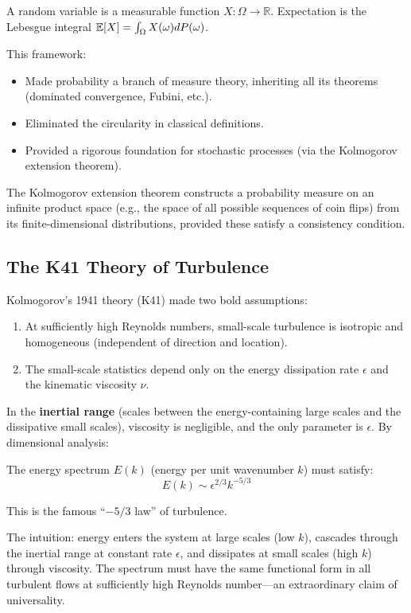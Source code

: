 A random variable is a measurable function $X: \Omega \to \mathbb{R}$. Expectation is the Lebesgue integral $\operatorname{\mathbb{E}}[X] = \int_\Omega X(\omega) dP(\omega)$.

This framework:
\begin{itemize}
    \item Made probability a branch of measure theory, inheriting all its theorems (dominated convergence, Fubini, etc.).
    \item Eliminated the circularity in classical definitions.
    \item Provided a rigorous foundation for stochastic processes (via the Kolmogorov extension theorem).
\end{itemize}

The Kolmogorov extension theorem constructs a probability measure on an infinite product space (e.g., the space of all possible sequences of coin flips) from its finite-dimensional distributions, provided these satisfy a consistency condition.

\subsection{The K41 Theory of Turbulence}

Kolmogorov's 1941 theory (K41) made two bold assumptions:
\begin{enumerate}
    \item At sufficiently high Reynolds numbers, small-scale turbulence is isotropic and homogeneous (independent of direction and location).
    \item The small-scale statistics depend only on the energy dissipation rate $\epsilon$ and the kinematic viscosity $\nu$.
\end{enumerate}

In the \textbf{inertial range} (scales between the energy-containing large scales and the dissipative small scales), viscosity is negligible, and the only parameter is $\epsilon$. By dimensional analysis:

The energy spectrum $E(k)$ (energy per unit wavenumber $k$) must satisfy:
\[
E(k) \sim \epsilon^{2/3} k^{-5/3}
\]

This is the famous ``$-5/3$ law'' of turbulence.

The intuition: energy enters the system at large scales (low $k$), cascades through the inertial range at constant rate $\epsilon$, and dissipates at small scales (high $k$) through viscosity. The spectrum must have the same functional form in all turbulent flows at sufficiently high Reynolds number---an extraordinary claim of universality.

